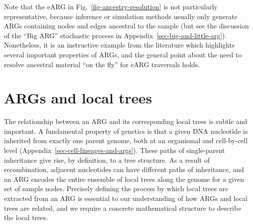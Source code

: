 \documentclass{article}
\begin{document}
Note that the \citet{wiuf1999recombination} eARG
in Fig.~\ref{fig-ancestry-resolution} is not particularly
representative, because inference or simulation methods usually
only generate ARGs containing nodes and edges ancestral to the sample
(but see the discussion of the ``Big ARG'' stochastic process in
Appendix~\ref{sec-big-and-little-arg}).
Nonetheless, it is an instructive example from the literature which highlights several
important properties of ARGs, and the general point about
the need to resolve ancestral material ``on the fly'' for eARG traversals
holds.

\section{ARGs and local trees}
\label{sec-ARG-and-local-trees}
The relationship between an ARG and its corresponding
local trees is subtle and important.
A fundamental property of genetics is that a
given DNA nucleotide is inherited from exactly one parent genome,
both at an organismal and cell-by-cell level
(Appendix~\ref{sec-cell-lineages-and-args}).
These paths of single-parent inheritance give rise,
by definition, to a tree structure.
As a result of recombination, adjacent nucleotides can have
different paths of inheritance, and
an ARG encodes the entire ensemble of local trees along the
genome for a given set of sample nodes.
Precisely defining the process by which local trees are extracted
from an ARG is essential to our understanding of how ARGs and local trees
are related, and we require a concrete mathematical structure
to describe the local trees.
\end{document}
